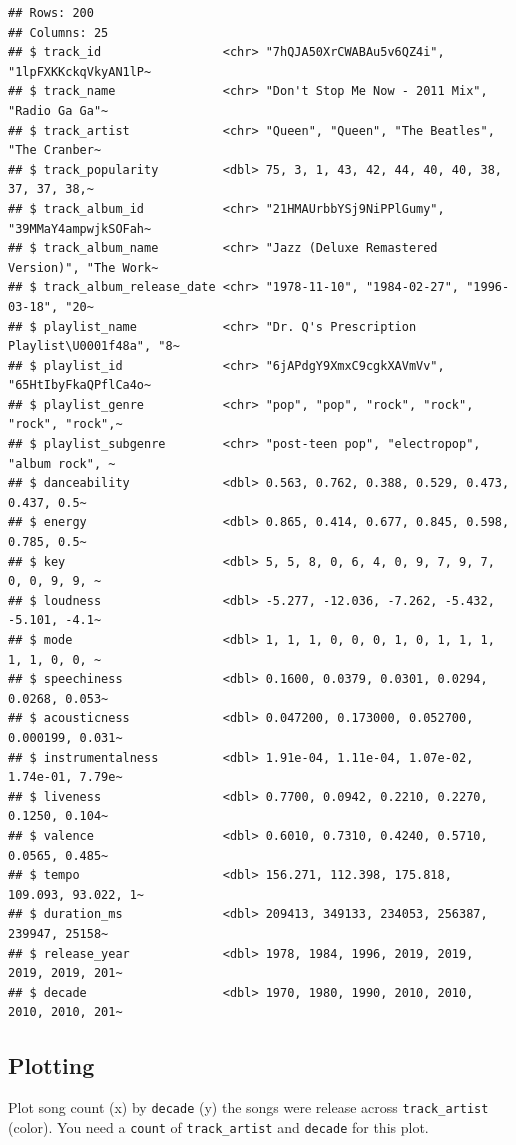 \documentclass[
]{book}
\begin{document}
\begin{verbatim}
## Rows: 200
## Columns: 25
## $ track_id                 <chr> "7hQJA50XrCWABAu5v6QZ4i", "1lpFXKKckqVkyAN1lP~
## $ track_name               <chr> "Don't Stop Me Now - 2011 Mix", "Radio Ga Ga"~
## $ track_artist             <chr> "Queen", "Queen", "The Beatles", "The Cranber~
## $ track_popularity         <dbl> 75, 3, 1, 43, 42, 44, 40, 40, 38, 37, 37, 38,~
## $ track_album_id           <chr> "21HMAUrbbYSj9NiPPlGumy", "39MMaY4ampwjkSOFah~
## $ track_album_name         <chr> "Jazz (Deluxe Remastered Version)", "The Work~
## $ track_album_release_date <chr> "1978-11-10", "1984-02-27", "1996-03-18", "20~
## $ playlist_name            <chr> "Dr. Q's Prescription Playlist\U0001f48a", "8~
## $ playlist_id              <chr> "6jAPdgY9XmxC9cgkXAVmVv", "65HtIbyFkaQPflCa4o~
## $ playlist_genre           <chr> "pop", "pop", "rock", "rock", "rock", "rock",~
## $ playlist_subgenre        <chr> "post-teen pop", "electropop", "album rock", ~
## $ danceability             <dbl> 0.563, 0.762, 0.388, 0.529, 0.473, 0.437, 0.5~
## $ energy                   <dbl> 0.865, 0.414, 0.677, 0.845, 0.598, 0.785, 0.5~
## $ key                      <dbl> 5, 5, 8, 0, 6, 4, 0, 9, 7, 9, 7, 0, 0, 9, 9, ~
## $ loudness                 <dbl> -5.277, -12.036, -7.262, -5.432, -5.101, -4.1~
## $ mode                     <dbl> 1, 1, 1, 0, 0, 0, 1, 0, 1, 1, 1, 1, 1, 0, 0, ~
## $ speechiness              <dbl> 0.1600, 0.0379, 0.0301, 0.0294, 0.0268, 0.053~
## $ acousticness             <dbl> 0.047200, 0.173000, 0.052700, 0.000199, 0.031~
## $ instrumentalness         <dbl> 1.91e-04, 1.11e-04, 1.07e-02, 1.74e-01, 7.79e~
## $ liveness                 <dbl> 0.7700, 0.0942, 0.2210, 0.2270, 0.1250, 0.104~
## $ valence                  <dbl> 0.6010, 0.7310, 0.4240, 0.5710, 0.0565, 0.485~
## $ tempo                    <dbl> 156.271, 112.398, 175.818, 109.093, 93.022, 1~
## $ duration_ms              <dbl> 209413, 349133, 234053, 256387, 239947, 25158~
## $ release_year             <dbl> 1978, 1984, 1996, 2019, 2019, 2019, 2019, 201~
## $ decade                   <dbl> 1970, 1980, 1990, 2010, 2010, 2010, 2010, 201~
\end{verbatim}

\hypertarget{plotting}{%
\subsection{Plotting}\label{plotting}}

Plot song count (x) by \texttt{decade} (y) the songs were release across \texttt{track\_artist} (color). You need a \texttt{count} of \texttt{track\_artist} and \texttt{decade} for this plot.
\end{document}
